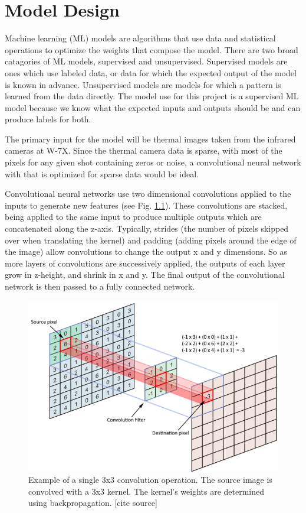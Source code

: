 %
\chapter{Model Design}
\label{sec:code:model}

Machine learning (ML) models are algorithms that use data and statistical operations to optimize the weights that compose the model.
There are two broad catagories of ML models, supervised and unsupervised.
Supervised models are ones which use labeled data, or data for which the expected output of the model is known in advance.
Unsupervised models are models for which a pattern is learned from the data directly.
The model use for this project is a supervised ML model because we know what the expected inputs and outputs should be and can produce labels for both.

The primary input for the model will be thermal images taken from the infrared cameras at W-7X.
Since the thermal camera data is sparse, with most of the pixels for any given shot containing zeros or noise, a convolutional neural network with that is optimized for sparse data would be ideal.

Convolutional neural networks use two dimensional convolutions applied to the inputs to generate new features (see Fig. \ref{fig:code:2DConv}).
These convolutions are stacked, being applied to the same input to produce multiple outputs which are concatenated along the z-axis.
Typically, strides (the number of pixels skipped over when translating the kernel) and padding (adding pixels around the edge of the image) allow convolutions to change the output x and y dimensions.
So as more layers of convolutions are successively applied, the outputs of each layer grow in z-height, and shrink in x and y.
The final output of the convolutional network is then passed to a fully connected network.


\begin{figure}[htb]
    \includegraphics[width=\textwidth]{images/2d-Conv.png}
    \caption{Example of a single 3x3 convolution operation. The source image is convolved with a 3x3 kernel. The kernel's weights are determined using backpropagation. [cite source]}
    \label{fig:code:2DConv}
\end{figure}

